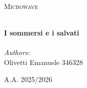 
\begin{titlepage}
\vbox{ }
\vbox{ }
\begin{center}
\textsc{\Large Microwave}\\[0.3cm]

\vbox{ }

\HRule \\[0.5cm]
{ \huge \bfseries I sommersi e i salvati}\\[0.2cm]
{\large \bfseries }
\HRule \\[1.5cm]

\large
\emph{Authors:}\\[0.5cm]

Olivetti Emanuele 346328 \\  

\vfill

{\large A.A. 2025/2026}
\end{center}
\end{titlepage}